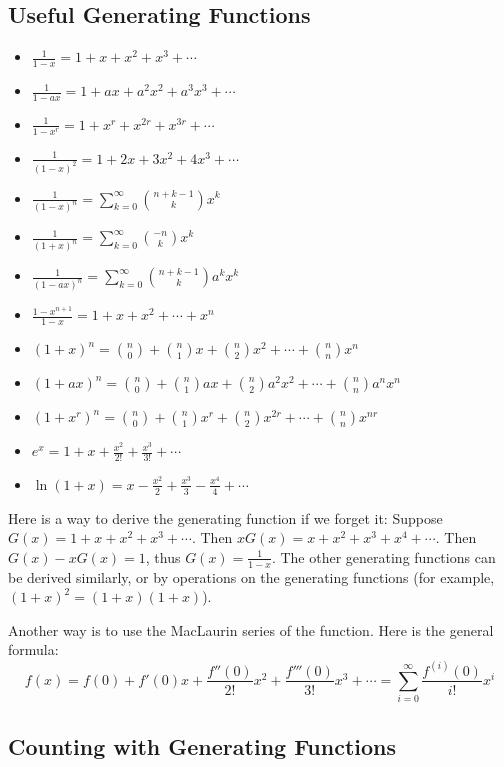 \documentclass[a4paper,12pt]{article}
\begin{document}
\subsection{Useful Generating Functions}

\begin{itemize}
	\item $\frac{1}{1-x} = 1 + x + x^2 + x^3 + \cdots$
	\item $\frac{1}{1-ax} = 1 + ax + a^2x^2 + a^3x^3 + \cdots$
	\item $\frac{1}{1-x^r} = 1 + x^r + x^{2r} + x^{3r} + \cdots$
	\item $\frac{1}{(1-x)^2} = 1 + 2x + 3x^2 + 4x^3 + \cdots$
	\item $\frac{1}{(1-x)^n} = \sum_{k=0}^{\infty} \binom{n+k-1}{k} x^k$
	\item $\frac{1}{(1+x)^n} = \sum_{k=0}^{\infty} \binom{-n}{k} x^k$
	\item $\frac{1}{(1-ax)^n} = \sum_{k=0}^{\infty} \binom{n+k-1}{k} a^k x^k$
	\item $\frac{1-x^{n+1}}{1-x} = 1 + x + x^2 + \cdots + x^{n}$
	\item $(1+x)^n = \binom{n}{0} + \binom{n}{1} x + \binom{n}{2} x^2 + \cdots + \binom{n}{n} x^n$
	\item $(1+ax)^n = \binom{n}{0} + \binom{n}{1} ax + \binom{n}{2} a^2 x^2 + \cdots + \binom{n}{n} a^n x^n$
	\item $(1+x^r)^n = \binom{n}{0} + \binom{n}{1} x^r + \binom{n}{2} x^{2r} + \cdots + \binom{n}{n} x^{nr}$
	\item $e^x = 1 + x + \frac{x^2}{2!} + \frac{x^3}{3!} + \cdots$
	\item $\ln(1+x) = x - \frac{x^2}{2} + \frac{x^3}{3} - \frac{x^4}{4} + \cdots$
\end{itemize}

Here is a way to derive the generating function if we forget it:
Suppose $G(x) = 1 + x + x^2 + x^3 + \cdots$.
Then $xG(x) = x + x^2 + x^3 + x^4 + \cdots$.
Then $G(x) - xG(x) = 1$, thus $G(x) = \frac{1}{1-x}$.
The other generating functions can be derived similarly, or by operations on the generating functions (for example, $(1+x)^2 = (1+x)(1+x)$).

Another way is to use the MacLaurin series of the function.
Here is the general formula:
\begin{equation*}
	f(x) = f(0) + f'(0) x + \frac{f''(0)}{2!} x^2 + \frac{f'''(0)}{3!} x^3 + \cdots = \sum_{i=0}^{\infty} \frac{f^{(i)}(0)}{i!} x^i
\end{equation*}
\subsection{Counting with Generating Functions}
\end{document}
